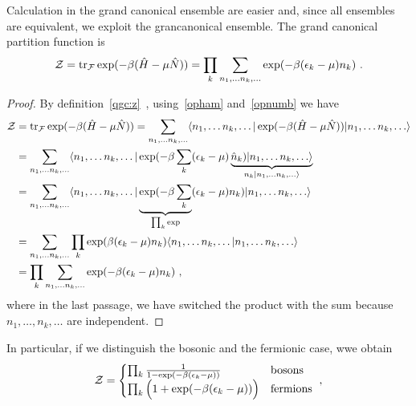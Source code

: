     Calculation in the grand canonical ensemble are easier and, since all ensembles are equivalent, we exploit the grancanonical ensemble. The grand canonical partition function is 
    \begin{equation*}
        \mathcal Z = \operatorname{tr}_{\mathcal F} \exp(- \beta (\hat H - \mu \hat N)) = \prod_k \sum_{n_1, \ldots n_k, \ldots} \exp(-\beta(\epsilon_k - \mu)n_k) ~.
    \end{equation*}
    \begin{proof}
        By definition~\eqref{qgc:z}~, using~\eqref{opham} and~\eqref{opnumb} we have
        \begin{equation*}
        \begin{aligned}
            \mathcal Z & = \operatorname{tr}_{\mathcal F} \exp(- \beta (\hat H - \mu \hat N)) = \sum_{n_1, \ldots n_k, \ldots} \langle n_1, \ldots n_k, \ldots\vert \exp(- \beta (\hat H - \mu \hat N)) \vert n_1, \ldots n_k, \ldots\rangle \\ & = \sum_{n_1, \ldots n_k, \ldots} \langle n_1, \ldots n_k, \ldots\vert \exp(- \beta \sum_k (\epsilon_k - \mu) \underbrace{\hat n_k) \vert n_1, \ldots n_k, \ldots\rangle}_{n_k \vert n_1, \ldots n_k, \ldots\rangle} \\ & = \sum_{n_1, \ldots n_k, \ldots} \langle n_1, \ldots n_k, \ldots\vert \underbrace{\exp(- \beta \sum_k}_{\prod_k \exp} (\epsilon_k - \mu) n_k) \vert n_1, \ldots n_k, \ldots\rangle \\ & = \sum_{n_1, \ldots n_k, \ldots} \prod_k \exp(\beta (\epsilon_k - \mu) n_k) \langle n_1, \ldots n_k, \ldots\vert n_1, \ldots n_k, \ldots\rangle \\ & = \prod_k \sum_{n_1, \ldots n_k, \ldots} \exp(-\beta(\epsilon_k - \mu)n_k) ~,
        \end{aligned}
        \end{equation*}
        where in the last passage, we have switched the product with the sum because $n_1, \ldots, n_k, \ldots$ are independent.
    \end{proof}
    In particular, if we distinguish the bosonic and the fermionic case, wwe obtain
    \begin{equation*}
        \mathcal Z = \begin{cases}
            \prod_k \frac{1}{1 - \exp (- \beta (\epsilon_k - \mu))} & \textnormal{bosons} \\
            \prod_k \Big (1 + \exp (- \beta (\epsilon_k - \mu)) \Big ) & \textnormal{fermions} \\
        \end{cases} ~,
    \end{equation*}
